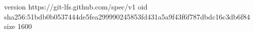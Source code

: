 version https://git-lfs.github.com/spec/v1
oid sha256:51bdb0b0537444de5fea299990245853fd431a5a9f43f6f787dbdc16c3db6f84
size 1600

